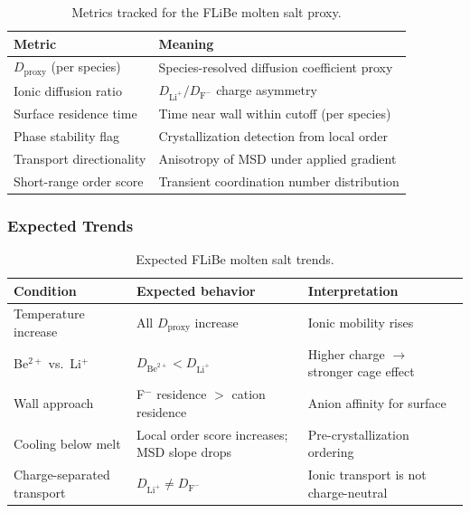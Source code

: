 \documentclass[12pt]{article}
\begin{document}
\begin{table}[H]
\centering
\caption{Metrics tracked for the FLiBe molten salt proxy.}
\label{tab:flibe_metrics}
\begin{tabular}{ll}
\toprule
\textbf{Metric} & \textbf{Meaning} \\
\midrule
$D_{\mathrm{proxy}}$ (per species)    & Species-resolved diffusion coefficient proxy \\
Ionic diffusion ratio                 & $D_{\mathrm{Li}^+} / D_{\mathrm{F}^-}$ charge asymmetry \\
Surface residence time                & Time near wall within cutoff (per species) \\
Phase stability flag                  & Crystallization detection from local order \\
Transport directionality              & Anisotropy of MSD under applied gradient \\
Short-range order score               & Transient coordination number distribution \\
\bottomrule
\end{tabular}
\end{table}

\subsubsection*{Expected Trends}

\begin{table}[H]
\centering
\caption{Expected FLiBe molten salt trends.}
\label{tab:flibe_trends}
\begin{tabular}{p{}p{}p{}}
\toprule
\textbf{Condition} & \textbf{Expected behavior} & \textbf{Interpretation} \\
\midrule
Temperature increase        & All $D_{\mathrm{proxy}}$ increase             & Ionic mobility rises \\
Be$^{2+}$ vs.\ Li$^+$       & $D_{\mathrm{Be}^{2+}} < D_{\mathrm{Li}^+}$   & Higher charge $\to$ stronger cage effect \\
Wall approach               & F$^-$ residence $>$ cation residence          & Anion affinity for surface \\
Cooling below melt          & Local order score increases; MSD slope drops  & Pre-crystallization ordering \\
Charge-separated transport  & $D_{\mathrm{Li}^+} \neq D_{\mathrm{F}^-}$    & Ionic transport is not charge-neutral \\
\bottomrule
\end{tabular}
\end{table}
\end{document}
